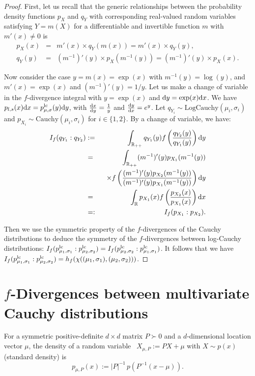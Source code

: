 \documentclass[journal]{IEEEtran}
\begin{document}
\begin{proof}
First, let us recall that the generic relationships between the probability density functions $p_X$ and $q_Y$
with corresponding real-valued random variables satisfying $Y=m(X)$ for a differentiable and invertible function $m$ with $m'(x)\not=0$ is
\begin{eqnarray*}
p_X(x) &=& m'(x) \times q_Y(m(x)) = m'(x) \times q_Y(y),\\
q_Y(y) &=&  (m^{-1})'(y) \times p_X(m^{-1}(y))= (m^{-1})'(y) \times p_X(x). \label{eq:densitytransform}
\end{eqnarray*}

 
Now consider the case  $y=m(x)=\exp(x)$ with $m^{-1}(y)=\log(y)$, and $m'(x)=\exp(x)$ and $({m^{-1}})'(y)= {1/y}$.
Let us make a change of variable in the $f$-divergence integral with $y=\exp(x)$ and $\mathrm{d}y=\exp(x)\mathrm{d}x$.
We have $
p_{l,s}(x)\mathrm{d}x=p^{\mathrm{lc}}_{\mu,\sigma}(y)\mathrm{d}y$,
with $\frac{\mathrm{d}x}{\mathrm{d}y}=\frac{1}{y}$ and $\frac{\mathrm{d}y}{\mathrm{d}x}=e^y$.
Let $q_{Y_i}\sim \mathrm{LogCauchy}(\mu_i,\sigma_i)$ and $p_{X_i}\sim \mathrm{Cauchy}(\mu_i,\sigma_i)$ for $i\in\{1,2\}$.
By a change of variable, we have:
\begin{eqnarray*}
I_f(q_{Y_1}:q_{Y_2}) &:=&  \int_{{\mathbb{R}}_{++}} q_{Y_1}(y) f\left( \frac{q_{Y_2}(y)}{q_{Y_1}(y)}\right) \mathrm{d}y \\
&=& \int_{{\mathbb{R}}_{++}} ({m^{-1}})'(y)  p_{X_1}(m^{-1}(y)) \\
& & \ \ \times f\left( \frac{({m^{-1}})'(y) p_{X_2}(m^{-1}(y))}{({m^{-1}})'(y) p_{X_1}({m}^{-1}(y))} \right) \mathrm{d}y\\
&=& \int_{{\mathbb{R}}} p_{X_1}(x)f\left( \frac{p_{X_2}(x)}{p_{X_1}(x)}\right) \mathrm{d}x\\
&=:& I_f(p_{X_1}:p_{X_2}).
\end{eqnarray*}

Then we use the symmetric property of the $f$-divergences of the Cauchy distributions to deduce the symmetry of the $f$-divergences between
 log-Cauchy distributions: $I_f(p^{\mathrm{lc}}_{\mu_1,\sigma_1}:p^{\mathrm{lc}}_{\mu_2,\sigma_2})=I_f(p^{\mathrm{lc}}_{\mu_2,\sigma_2}:p^{\mathrm{lc}}_{\mu_1,\sigma_1})$. 
It follows that we have $I_f(p^{\mathrm{lc}}_{\mu_1,\sigma_1}:p^{\mathrm{lc}}_{\mu_2,\sigma_2})=h_f(\chi((\mu_1,\sigma_1),(\mu_2,\sigma_2)))$.
\end{proof}








\section{$f$-Divergences between multivariate Cauchy distributions}\label{sec:fdivasymmetric}
For a symmetric positive-definite $d\times d$ matrix $P\succ 0$ and a $d$-dimensional location vector $\mu$, 
the density of a random variable~\cite{infproj-2021} $X_{\mu,P}:=P X+\mu$ with $X\sim p(x)$ (standard density) is 
\begin{equation}\label{eq:LSF}
p_{\mu,P}(x):=|P|^{-1}\, p(P^{-1}(x-\mu)).
\end{equation}
\end{document}
